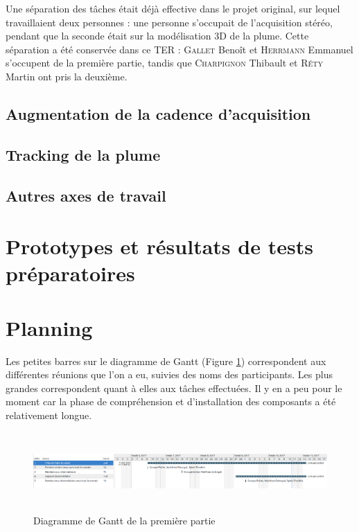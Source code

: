 \documentclass{article}
\begin{document}
	Une séparation des tâches était déjà effective dans le projet original, sur lequel travaillaient deux personnes : une personne s'occupait de l'acquisition stéréo, pendant que la seconde était sur la modélisation 3D de la plume. Cette séparation a été conservée dans ce TER : \textsc{Gallet} Benoît et \textsc{Herrmann} Emmanuel s'occupent de la première partie, tandis que \textsc{Charpignon} Thibault et \textsc{Réty} Martin ont pris la deuxième.

\subsection{Augmentation de la cadence d'acquisition}



\subsection{Tracking de la plume}



\subsection{Autres axes de travail}



\section{Prototypes et résultats de tests préparatoires}



\section{Planning}

Les petites barres sur le diagramme de Gantt (Figure \ref{gantt1}) correspondent aux différentes réunions que l'on a eu, suivies des noms des participants. Les plus grandes correspondent quant à elles aux tâches effectuées. Il y en a peu pour le moment car la phase de compréhension et d'installation des composants a été relativement longue.

\begin{figure}[!h]
\centering
\includegraphics[width=\textwidth, height=3cm]{Modules/Picture/diag1.png}
\caption{Diagramme de Gantt de la première partie}
\label{gantt1}
\end{figure}
\end{document}
